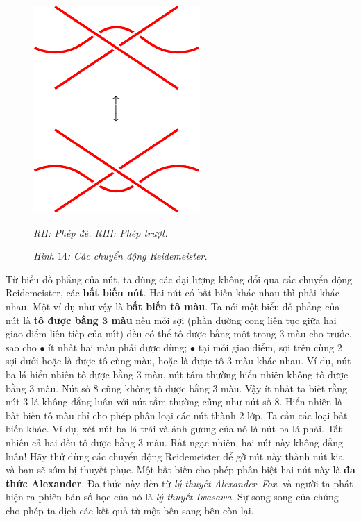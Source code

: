 \begin{multicols}{2}
\begin{figure}[H]
		\includegraphics[width= 0.3\linewidth]{R3.pdf}
		\caption{\small\textit{\color{duongvaotoanhoc}RII: Phép đè.\hspace*{30pt} RIII: Phép trượt.}}
		\caption{\small\textit{\color{duongvaotoanhoc}Hình $14$: Các chuyển động Reidemeister.}}
		\vspace*{-10pt}
	\end{figure}
	Từ biểu đồ phẳng của nút, ta dùng các đại lượng không đổi qua các chuyển động Reidemeister, các {\bf\color{duongvaotoanhoc} bất biến nút}. Hai nút có bất biến khác nhau thì phải khác nhau. Một ví dụ như vậy là {\bf\color{duongvaotoanhoc} bất biến tô màu}. Ta nói một biểu đồ phẳng của nút là {\bf\color{duongvaotoanhoc} tô được bằng $\pmb{3}$ màu} nếu mỗi sợi (phần đường cong liên tục giữa hai giao điểm liên tiếp của nút) đều có thể tô được bằng một trong $3$ màu cho trước, sao cho
	\vskip 0.05cm
	$\bullet$ ít nhất hai màu phải được dùng;
	\vskip 0.05cm
	$\bullet$ tại mỗi giao điểm, sợi trên cùng $2$ sợi dưới hoặc là được tô cùng màu, hoặc là được tô $3$ màu khác nhau.
	\vskip 0.05cm
	Ví dụ, nút ba lá hiển nhiên tô được bằng $3$ màu, nút tầm thường hiển nhiên không tô được bằng $3$ màu. Nút số $8$ cũng không tô được bằng $3$ màu. Vậy ít nhất ta biết rằng nút $3$ lá không đẳng luân với nút tầm thường cũng như nút số $8$.
	\vskip 0.05cm
	Hiển nhiên là bất biến tô màu chỉ cho phép phân loại các nút thành $2$ lớp. Ta cần các loại bất biến khác. Ví dụ, xét nút ba lá trái và ảnh gương của nó là nút ba lá phải. Tất nhiên cả hai đều tô được bằng $3$ màu. Rất ngạc nhiên, hai nút này không đẳng luân! Hãy thử dùng các chuyển động Reidemeister để gỡ nút này thành nút kia và bạn sẽ sớm bị thuyết phục. Một bất biến cho phép phân biệt hai nút này là {\bf\color{duongvaotoanhoc} đa thức Alexander}. Đa thức này đến từ {\it lý thuyết Alexander--Fox}, và người ta phát hiện ra phiên bản số học của nó là {\it lý thuyết Iwasawa}. Sự song song của chúng cho phép ta dịch các kết quả từ một bên sang bên còn lại.
	\begin{figure}[H]
		\vspace*{-10pt}

\end{figure}
\end{multicols}
